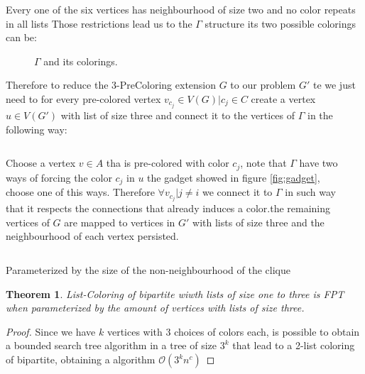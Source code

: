 \documentclass[9pt, compress]{beamer}
\newtheorem{teorema}{Theorem}
\newcommand{\?}{\textcolor{warn}{\textit{?}}}
\begin{document}
     \begin{frame}{Every one of the six vertices has neighbourhood of size two and no color repeats in all lists}
      Those restrictions lead us to the $\Gamma$ structure its two possible colorings can be:

      \begin{figure}[H]
        \centering
        \fontsize{4}{10}
        
        \caption{$\Gamma$ and its colorings.}
        \label{fig:2-edge-b}
      \end{figure}
      Therefore to reduce the 3-PreColoring extension $G$ to our problem $G'$ te we just need to for every pre-colored vertex  $v_{c_j} \in V(G) | c_j \in C$ create a vertex $u \in V(G')$ with list of size three and connect it to the vertices of $\Gamma$ in the following way:
      
     \end{frame}
     \begin{frame}
       \begin{columns}
        \begin{column}{0.5\textwidth}
          Choose a vertex $v \in A$ tha is pre-colored with color $c_j$, note that $\Gamma$ have two ways of forcing the color $c_j$ in $u$ the gadget showed in figure \ref{fig:gadget}, choose one of this ways. Therefore $\forall v_{c_j} | j \neq i$ we connect it to $\Gamma$ in such way that it respects the connections that already induces a color.the remaining vertices of $G$ are mapped to vertices in $G'$ with lists of size three and the neighbourhood of each vertex persisted.
        \end{column}
        \begin{column}{0.5\textwidth}
        \end{column}
      \end{columns}
     \end{frame}
     \begin{frame}{Parameterized by the size of the non-neighbourhood of the clique}
       
        \begin{teorema}
        List-Coloring of bipartite wiwth lists of size one to three is FPT when parameterized by the amount of vertices with lists of size three.
        \end{teorema}
        \begin{proof}
         Since we have $k$ vertices with 3 choices of colors each, is possible to obtain a bounded search tree algorithm  in a tree of size $3^k$ that lead to a 2-list coloring of bipartite, obtaining a algorithm $\mathcal{O}(3^kn^{c})$
\end{proof}
     \end{frame}
     
\end{document}
